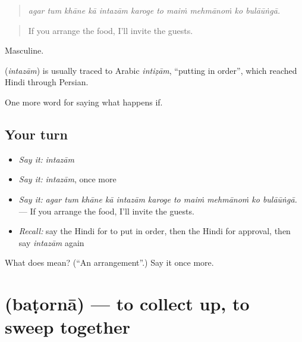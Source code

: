 \begin{quote}
          
\end{quote}

\begin{quote}
\emph{agar tum khāne kā intazām karoge to maiṁ mehmānoṁ ko bulāūṅgā.}
\end{quote}

\begin{quote}
If you arrange the food, I'll invite the guests.
\end{quote}

Masculine.

\begin{cousinweb}
\textbf{} (\emph{intazām}) is usually traced to Arabic \emph{intiẓām}, \textquotedblleft{}putting in order\textquotedblright{}, which reached Hindi through Persian.
\end{cousinweb}

\begin{grammarlens}[title={What you've built}]
One more word for saying what happens if.
\end{grammarlens}

\subsection*{Your turn}
\begin{itemize}
\raggedright
  \item \emph{Say it:} \emph{intazām}
  \item \emph{Say it:} \emph{intazām}, once more
  \item \emph{Say it:} \emph{agar tum khāne kā intazām karoge to maiṁ mehmānoṁ ko bulāūṅgā.} — If you arrange the food, I'll invite the guests.
  \item \emph{Recall:} say the Hindi for to put in order, then the Hindi for approval, then say \emph{intazām} again
\end{itemize}

\begin{tcolorbox}[breakable,colback=teal!4,colframe=teal!35!black,title={Before you move on}]
What does  mean? (\textquotedblleft{}An arrangement\textquotedblright{}.) Say it once more.
\end{tcolorbox}
\section[\texorpdfstring{\hi{बटोरना} (baṭornā)}{बटोरना (baṭornā)}]{ (baṭornā) — to collect up, to sweep together}

